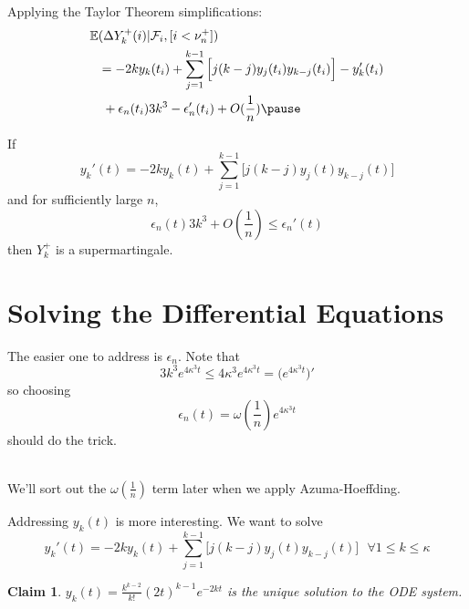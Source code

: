 \documentclass{beamer}
\newtheorem{claim}[theorem]{Claim}
\begin{document}
\begin{frame}

  Applying the Taylor Theorem simplifications: \pause
  \[
    \begin{aligned}
      \mathbb{E}&(\Delta Y^{+}_{k}(i)|\mathcal{F}_{i}, [i < \nu_{n}^{+}]) \\
      &= -2 k y_{k}(t_{i}) + \sum\limits_{j=1}^{k-1} \Big[ j (k - j) y_{j}(t_{i})y_{k-j}(t_{i})\Big] - y_{k}'(t_{i}) \\
      &\hbox{ } + \epsilon_{n}(t_{i}) 3 k^{3}  - \epsilon_{n}'(t_{i}) + O(\frac{1}{n}) \pause
    \end{aligned}
  \]
  
  If 
  \[y_{k}'(t) = -2 k y_{k}(t) + \sum\limits_{j=1}^{k-1} \Big[ j (k - j) y_{j}(t)y_{k-j}(t)\Big]\] \pause
  and for sufficiently large \(n\), 
  \[ \epsilon_{n}(t) 3 k^{3} + O(\frac{1}{n}) \leq \epsilon_{n}'(t)\] \pause
  then \(Y^{+}_{k}\) is a supermartingale.

\end{frame}

\section{Solving the Differential Equations}

\begin{frame}
  The easier one to address is \(\epsilon_{n}\). \pause Note that 
  \[3k^{3}e^{4 \kappa^{3}t} \leq 4 \kappa^{3} e^{4 \kappa^{3}t} = \Big(e^{4 \kappa^{3}t} \Big)'\] \pause
  so choosing 
  \[\epsilon_{n}(t) = \omega(\frac{1}{n}) e^{4 \kappa^{3}t}\]
  should do the trick. \pause \\~\

  We'll sort out the \(\omega(\frac{1}{n})\) term later when we apply Azuma-Hoeffding.

\end{frame}

\begin{frame}
  Addressing \(y_{k}(t)\) is more interesting. \pause We want to solve
  \[y_{k}'(t) = -2 k y_{k}(t) + \sum\limits_{j=1}^{k-1} \Big[ j (k - j) y_{j}(t)y_{k-j}(t)\Big] \text{ } \forall 1 \leq k \leq \kappa\] \pause
  \begin{claim}
    \(y_{k}(t) = \frac{k^{k-2}}{k!}(2t)^{k-1} e^{-2kt}\) is the unique solution to the ODE system.
  \end{claim}
  
\end{frame}
\end{document}
